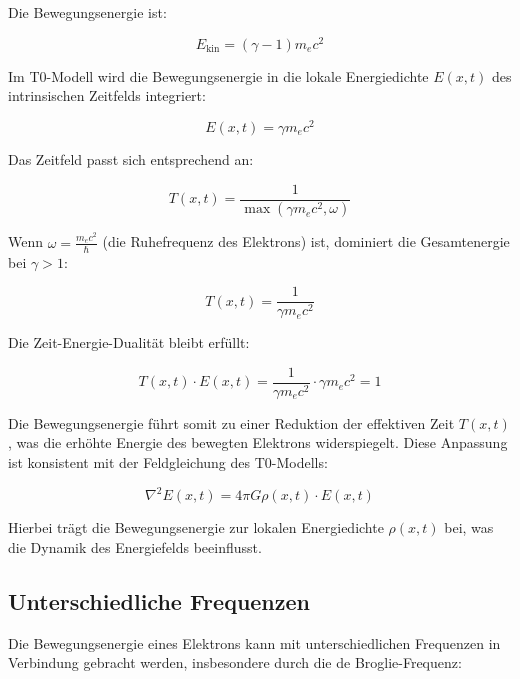 	Die Bewegungsenergie ist:
	
	\begin{equation}
		E_{\text{kin}} = (\gamma - 1) m_e c^2
	\end{equation}
	
	Im T0-Modell wird die Bewegungsenergie in die lokale Energiedichte \( E(x,t) \) des intrinsischen Zeitfelds integriert:
	
	\begin{equation}
		E(x,t) = \gamma m_e c^2
	\end{equation}
	
	Das Zeitfeld passt sich entsprechend an:
	
	\begin{equation}
		T(x,t) = \frac{1}{\max(\gamma m_e c^2, \omega)}
	\end{equation}
	
	Wenn \(\omega = \frac{m_e c^2}{\hbar}\) (die Ruhefrequenz des Elektrons) ist, dominiert die Gesamtenergie bei \(\gamma > 1\):
	
	\begin{equation}
		T(x,t) = \frac{1}{\gamma m_e c^2}
	\end{equation}
	
	Die Zeit-Energie-Dualität bleibt erfüllt:
	
	\begin{equation}
		T(x,t) \cdot E(x,t) = \frac{1}{\gamma m_e c^2} \cdot \gamma m_e c^2 = 1
	\end{equation}
	
	Die Bewegungsenergie führt somit zu einer Reduktion der effektiven Zeit \( T(x,t) \), was die erhöhte Energie des bewegten Elektrons widerspiegelt. Diese Anpassung ist konsistent mit der Feldgleichung des T0-Modells:
	
	\begin{equation}
		\nabla^2 E(x,t) = 4\pi G \rho(x,t) \cdot E(x,t)
		\label{eq:energy_field_equation}
	\end{equation}
	
	Hierbei trägt die Bewegungsenergie zur lokalen Energiedichte \(\rho(x,t)\) bei, was die Dynamik des Energiefelds beeinflusst.
	
	\subsection{Unterschiedliche Frequenzen}
	\label{subsec:electron_frequencies}
	
	Die Bewegungsenergie eines Elektrons kann mit unterschiedlichen Frequenzen in Verbindung gebracht werden, insbesondere durch die de Broglie-Frequenz:
	
